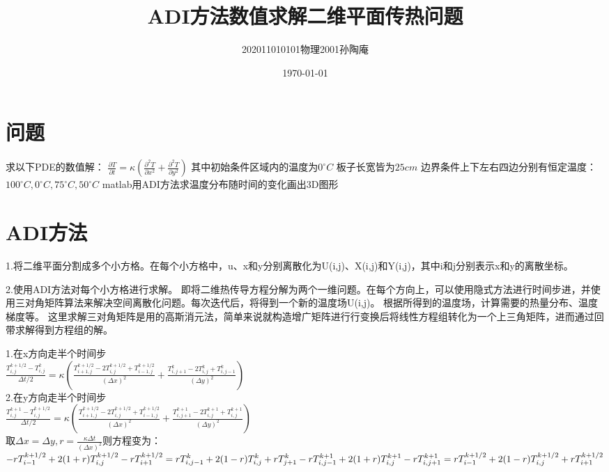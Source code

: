 \documentclass[12pt, a4paper, oneside]{ctexart}
\title{ADI方法数值求解二维平面传热问题}
\date{\today}
\author{202011010101物理2001孙陶庵}
\begin{document}
\begin{spacing}{2.0}
\tableofcontents
\maketitle

\section{问题}
求以下PDE的数值解：
$\displaystyle \frac{\partial T}{\partial t} = \kappa (\frac{\partial^2 T}{\partial x^2} + \frac{\partial^2 T}{\partial y^2})$
其中初始条件区域内的温度为$0^{\circ}C$
板子长宽皆为$25cm$
边界条件上下左右四边分别有恒定温度：$100^{\circ}C, 0^{\circ}C, 75^{\circ}C, 50^{\circ}C$
matlab用ADI方法求温度分布随时间的变化画出3D图形


\section{ADI方法}
1.将二维平面分割成多个小方格。在每个小方格中，u、x和y分别离散化为U(i,j)、X(i,j)和Y(i,j)，其中i和j分别表示x和y的离散坐标。

2.使用ADI方法对每个小方格进行求解。
即将二维热传导方程分解为两个一维问题。在每个方向上，可以使用隐式方法进行时间步进，并使用三对角矩阵算法来解决空间离散化问题。每次迭代后，将得到一个新的温度场U(i,j)。
根据所得到的温度场，计算需要的热量分布、温度梯度等。
这里求解三对角矩阵是用的高斯消元法，简单来说就构造增广矩阵进行行变换后将线性方程组转化为一个上三角矩阵，进而通过回带求解得到方程组的解。

1.在x方向走半个时间步\\
$\displaystyle \frac{T_{i,j}^{k+1/2}-T_{i,j}^{k}}{\Delta t/2}=\kappa\left(\frac{T_{i+1,j}^{k+1/2}-2T_{i,j}^{k+1/2}+T_{i-1,j}^{k+1/2}}{\left(\Delta x\right)^{2}}+\frac{T_{i,j+1}^{k}-2T_{i,j}^{k}+T_{i,j-1}^{k}}{\left(\Delta y\right)^{2}}\right)$\\
2.在y方向走半个时间步\\
$\displaystyle \frac{T_{i,j}^{k+1}-T_{i,j}^{k+1/2}}{\Delta t/2}=\kappa\left(\frac{T_{i+1,j}^{k+1/2}-2T_{i,j}^{k+1/2}+T_{i-1,j}^{k+1/2}}{\left(\Delta x\right)^{2}}+\frac{T_{i,j+1}^{k+1}-2T_{i,j}^{k+1}+T_{i,j}^{k+1}}{\left(\Delta y\right)^{2}}\right)$\\
取$\displaystyle \Delta x=\Delta y,r=\frac{\kappa\Delta t}{\left(\Delta x\right)^{2}}$则方程变为：\\
$\displaystyle -rT_{i-1}^{k+1/2}+2(1+r)T_{i,j}^{k+1/2}-rT_{i+1}^{k+1/2}=rT_{i,j-1}^{k}+2(1-r)T_{i,j}^{k}+rT_{j+1}^{k}\\ -rT_{i,j-1}^{k+1}+2(1+r)T_{i,j}^{k+1}-rT_{i,j+1}^{k+1}=rT_{i-1}^{k+1/2}+2(1-r)T_{i,j}^{k+1/2}+rT_{i+1}^{k+1/2}$

\end{spacing}
\end{document}
